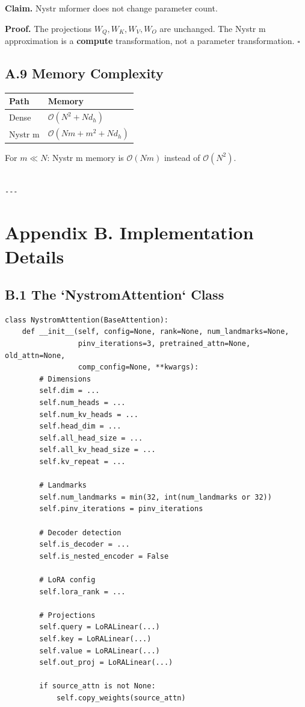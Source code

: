 \textbf{Claim.} Nystr mformer does not change parameter count.

\textbf{Proof.} The projections $W_Q, W_K, W_V, W_O$ are unchanged. The 
Nystr m approximation is a \textbf{compute} transformation, not a parameter 
transformation. $\square$

\subsection{A.9 Memory Complexity}

\begin{table}[H]
\centering
\small
\begin{tabular}{ll}
\toprule
\textbf{Path} & \textbf{Memory} \\
\midrule
Dense & $\mathcal{O}(N^2 + N d_h)$ \\
Nystr m & $\mathcal{O}(N m + m^2 + N d_h)$ \\
\bottomrule
\end{tabular}
\end{table}

For $m \ll N$: Nystr m memory is $\mathcal{O}(N m)$ instead of 
$\mathcal{O}(N^2)$.
\begin{lstlisting}

---
\end{lstlisting}


\section{Appendix B. Implementation Details}

\subsection{B.1 The `NystromAttention` Class}

\begin{lstlisting}
class NystromAttention(BaseAttention):
    def __init__(self, config=None, rank=None, num_landmarks=None,
                 pinv_iterations=3, pretrained_attn=None, old_attn=None,
                 comp_config=None, **kwargs):
        # Dimensions
        self.dim = ...
        self.num_heads = ...
        self.num_kv_heads = ...
        self.head_dim = ...
        self.all_head_size = ...
        self.all_kv_head_size = ...
        self.kv_repeat = ...
        
        # Landmarks
        self.num_landmarks = min(32, int(num_landmarks or 32))
        self.pinv_iterations = pinv_iterations
        
        # Decoder detection
        self.is_decoder = ...
        self.is_nested_encoder = False
        
        # LoRA config
        self.lora_rank = ...
        
        # Projections
        self.query = LoRALinear(...)
        self.key = LoRALinear(...)
        self.value = LoRALinear(...)
        self.out_proj = LoRALinear(...)
        
        if source_attn is not None:
            self.copy_weights(source_attn)
\end{lstlisting}

